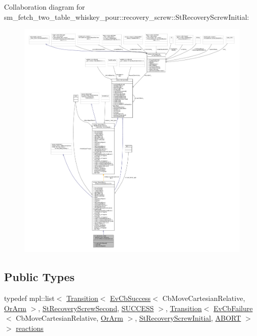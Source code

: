 Collaboration diagram for sm\+\_\+fetch\+\_\+two\+\_\+table\+\_\+whiskey\+\_\+pour\+:\+:recovery\+\_\+screw\+:\+:St\+Recovery\+Screw\+Initial\+:
\nopagebreak
\begin{figure}[H]
\begin{center}
\leavevmode
\includegraphics[width=350pt]{structsm__fetch__two__table__whiskey__pour_1_1recovery__screw_1_1StRecoveryScrewInitial__coll__graph}
\end{center}
\end{figure}
\subsection*{Public Types}
\begin{DoxyCompactItemize}
\item 
typedef mpl\+::list$<$ \hyperlink{classsmacc_1_1Transition}{Transition}$<$ \hyperlink{structsmacc_1_1EvCbSuccess}{Ev\+Cb\+Success}$<$ Cb\+Move\+Cartesian\+Relative, \hyperlink{classsm__fetch__two__table__whiskey__pour_1_1OrArm}{Or\+Arm} $>$, \hyperlink{structsm__fetch__two__table__whiskey__pour_1_1recovery__screw_1_1StRecoveryScrewSecond}{St\+Recovery\+Screw\+Second}, \hyperlink{structsmacc_1_1default__transition__tags_1_1SUCCESS}{S\+U\+C\+C\+E\+SS} $>$, \hyperlink{classsmacc_1_1Transition}{Transition}$<$ \hyperlink{structsmacc_1_1EvCbFailure}{Ev\+Cb\+Failure}$<$ Cb\+Move\+Cartesian\+Relative, \hyperlink{classsm__fetch__two__table__whiskey__pour_1_1OrArm}{Or\+Arm} $>$, \hyperlink{structsm__fetch__two__table__whiskey__pour_1_1recovery__screw_1_1StRecoveryScrewInitial}{St\+Recovery\+Screw\+Initial}, \hyperlink{structsmacc_1_1default__transition__tags_1_1ABORT}{A\+B\+O\+RT} $>$ $>$ \hyperlink{structsm__fetch__two__table__whiskey__pour_1_1recovery__screw_1_1StRecoveryScrewInitial_a560bddc35c9e663c398c1b7152cc505d}{reactions}
\end{DoxyCompactItemize}
